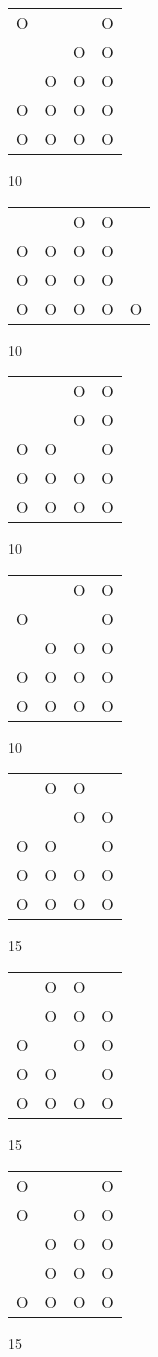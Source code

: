\begin{tabular}{|m{0.2cm}m{0.2cm}m{0.2cm}m{0.2cm}|}\hline
O& & &O\\
 & &O&O\\
 &O&O&O\\
O&O&O&O\\
O&O&O&O\\
\hline\end{tabular}10
\begin{tabular}{|m{0.2cm}m{0.2cm}m{0.2cm}m{0.2cm}m{0.2cm}|}\hline
 & &O&O& \\
O&O&O&O& \\
O&O&O&O& \\
O&O&O&O&O\\
\hline\end{tabular}10
\begin{tabular}{|m{0.2cm}m{0.2cm}m{0.2cm}m{0.2cm}|}\hline
 & &O&O\\
 & &O&O\\
O&O& &O\\
O&O&O&O\\
O&O&O&O\\
\hline\end{tabular}10
\begin{tabular}{|m{0.2cm}m{0.2cm}m{0.2cm}m{0.2cm}|}\hline
 & &O&O\\
O& & &O\\
 &O&O&O\\
O&O&O&O\\
O&O&O&O\\
\hline\end{tabular}10
\begin{tabular}{|m{0.2cm}m{0.2cm}m{0.2cm}m{0.2cm}|}\hline
 &O&O& \\
 & &O&O\\
O&O& &O\\
O&O&O&O\\
O&O&O&O\\
\hline\end{tabular}15
\begin{tabular}{|m{0.2cm}m{0.2cm}m{0.2cm}m{0.2cm}|}\hline
 &O&O& \\
 &O&O&O\\
O& &O&O\\
O&O& &O\\
O&O&O&O\\
\hline\end{tabular}15
\begin{tabular}{|m{0.2cm}m{0.2cm}m{0.2cm}m{0.2cm}|}\hline
O& & &O\\
O& &O&O\\
 &O&O&O\\
 &O&O&O\\
O&O&O&O\\
\hline\end{tabular}15

